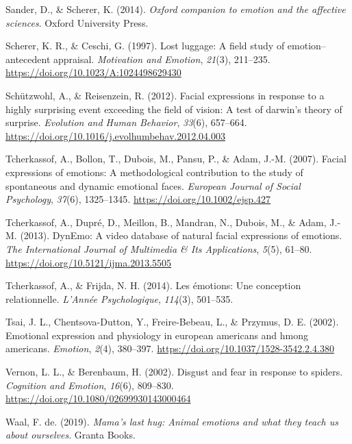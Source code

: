 \documentclass[
  english,
  doc]{apa7}
\newlength{\cslhangindent}
\newenvironment{cslreferences}%
  {\setlength{\parindent}{0pt}%
  \everypar{\setlength{\hangindent}{\cslhangindent}}\ignorespaces}%
  {\par}
\begin{document}
\begin{cslreferences}
\leavevmode\hypertarget{ref-sander2014oxford}{}%
Sander, D., \& Scherer, K. (2014). \emph{Oxford companion to emotion and the affective sciences}. Oxford University Press.

\leavevmode\hypertarget{ref-scherer1997lost}{}%
Scherer, K. R., \& Ceschi, G. (1997). Lost luggage: A field study of emotion--antecedent appraisal. \emph{Motivation and Emotion}, \emph{21}(3), 211--235. \url{https://doi.org/10.1023/A:1024498629430}

\leavevmode\hypertarget{ref-schutzwohl2012facial}{}%
Schützwohl, A., \& Reisenzein, R. (2012). Facial expressions in response to a highly surprising event exceeding the field of vision: A test of darwin's theory of surprise. \emph{Evolution and Human Behavior}, \emph{33}(6), 657--664. \url{https://doi.org/10.1016/j.evolhumbehav.2012.04.003}

\leavevmode\hypertarget{ref-tcherkassof2007facial}{}%
Tcherkassof, A., Bollon, T., Dubois, M., Pansu, P., \& Adam, J.-M. (2007). Facial expressions of emotions: A methodological contribution to the study of spontaneous and dynamic emotional faces. \emph{European Journal of Social Psychology}, \emph{37}(6), 1325--1345. \url{https://doi.org/10.1002/ejsp.427}

\leavevmode\hypertarget{ref-tcherkassof2013dynemo}{}%
Tcherkassof, A., Dupré, D., Meillon, B., Mandran, N., Dubois, M., \& Adam, J.-M. (2013). DynEmo: A video database of natural facial expressions of emotions. \emph{The International Journal of Multimedia \& Its Applications}, \emph{5}(5), 61--80. \url{https://doi.org/10.5121/ijma.2013.5505}

\leavevmode\hypertarget{ref-tcherkassof2014emotions}{}%
Tcherkassof, A., \& Frijda, N. H. (2014). Les émotions: Une conception relationnelle. \emph{L'Année Psychologique}, \emph{114}(3), 501--535.

\leavevmode\hypertarget{ref-tsai2002emotional}{}%
Tsai, J. L., Chentsova-Dutton, Y., Freire-Bebeau, L., \& Przymus, D. E. (2002). Emotional expression and physiology in european americans and hmong americans. \emph{Emotion}, \emph{2}(4), 380--397. \url{https://doi.org/10.1037/1528-3542.2.4.380}

\leavevmode\hypertarget{ref-vernon2002disgust}{}%
Vernon, L. L., \& Berenbaum, H. (2002). Disgust and fear in response to spiders. \emph{Cognition and Emotion}, \emph{16}(6), 809--830. \url{https://doi.org/10.1080/02699930143000464}

\leavevmode\hypertarget{ref-de2019mama}{}%
Waal, F. de. (2019). \emph{Mama's last hug: Animal emotions and what they teach us about ourselves}. Granta Books.


\end{cslreferences}
\end{document}
